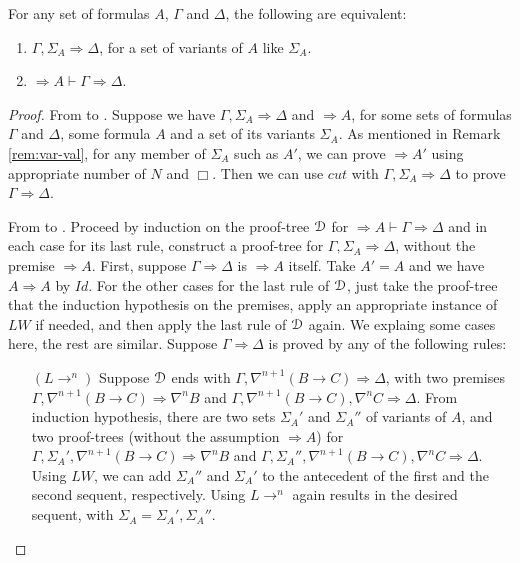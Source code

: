 \begin{lem} \label{lem:vdash}
  For any set of formulas $A$, $\Gamma$ and $\Delta$, the following are equivalent:
  \begin{enumerate}
    \item $\Gamma, \Sigma_A \Rightarrow \Delta$, for a set of variants of $A$ like $\Sigma_A$.
    \item $\Rightarrow A \vdash \Gamma \Rightarrow \Delta$.
  \end{enumerate}
\end{lem}
\begin{proof}
  From \1 to \2. Suppose we have $\Gamma, \Sigma_A \Rightarrow \Delta$ and $\Rightarrow A$, for some sets of formulas $\Gamma$ and $\Delta$, some formula $A$ and a set of its variants $\Sigma_A$. As mentioned in Remark \ref{rem:var-val}, for any member of $\Sigma_A$ such as $A'$, we can prove $\Rightarrow A'$ using appropriate number of $N$ and $\Box$. Then we can use $cut$ with $\Gamma, \Sigma_A \Rightarrow \Delta$ to prove $\Gamma \Rightarrow \Delta$.

  From \2 to \1. Proceed by induction on the proof-tree $\mathcal{D}$ for $\Rightarrow A \vdash \Gamma \Rightarrow \Delta$ and in each case for its last rule, construct a proof-tree for $\Gamma, \Sigma_A \Rightarrow \Delta$, without the premise $\Rightarrow A$. First, suppose $\Gamma \Rightarrow \Delta$ is $\Rightarrow A$ itself. Take $A' = A$ and we have $A \Rightarrow A$ by $Id$. For the other cases for the last rule of $\mathcal{D}$, just take the proof-tree that the induction hypothesis on the premises, apply an appropriate instance of $LW$ if needed, and then apply the last rule of $\mathcal{D}$ again. We explaing some cases here, the rest are similar. Suppose $\Gamma \Rightarrow \Delta$ is proved by any of the following rules:

  \begin{enumerate}
    \item[$(L \rightarrow ^n)$] Suppose $\mathcal{D}$ ends with $\Gamma, \nabla^{n+1} (B \rightarrow C) \Rightarrow \Delta$, with two premises $\Gamma, \nabla^{n+1} (B \rightarrow C) \Rightarrow \nabla^n B$ and $\Gamma, \nabla^{n+1} (B \rightarrow C), \nabla^n C \Rightarrow \Delta$. From induction hypothesis, there are two sets $\Sigma_A'$ and $\Sigma_A''$ of variants of $A$, and two proof-trees (without the assumption $\Rightarrow A$) for $\Gamma, \Sigma_A', \nabla^{n+1} (B \rightarrow C) \Rightarrow \nabla^n B$ and $\Gamma, \Sigma_A'', \nabla^{n+1} (B \rightarrow C), \nabla^n C \Rightarrow \Delta$. Using $LW$, we can add $\Sigma_A''$ and $\Sigma_A'$ to the antecedent of the first and the second sequent, respectively. Using $L \rightarrow ^n$ again results in the desired sequent, with $\Sigma_A = \Sigma_A', \Sigma_A''$.


\end{enumerate}
\end{proof}
